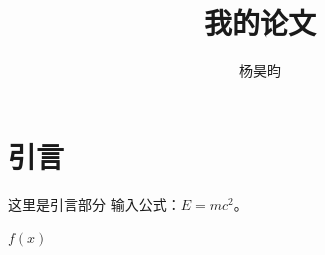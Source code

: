 \documentclass[11pt, a4paper]{ctexbook} %
\begin{document}
\title{我的论文}
\author{杨昊昀}
\maketitle

\section{引言} %
这里是引言部分
输入公式：$E = mc^2$。

$f(x)$
\end{document}
